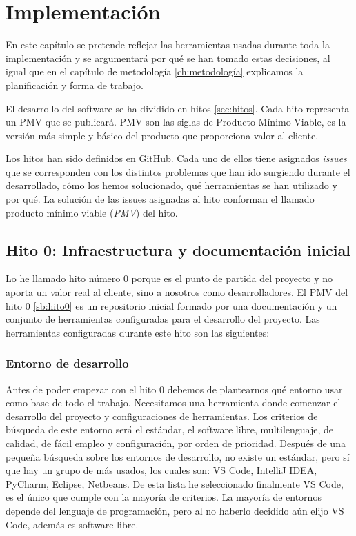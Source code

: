 
\chapter{Implementación}

En este capítulo se pretende reflejar las herramientas usadas durante toda la implementación y
se argumentará por qué se han tomado estas decisiones, al igual que en el capítulo de metodología \ref{ch:metodología} explicamos
la planificación y forma de trabajo.

El desarrollo del software se ha dividido en hitos \ref*{sec:hitos}. Cada hito representa un PMV que se publicará.
PMV son las siglas de Producto Mínimo Viable, es la versión más simple y básico del producto que proporciona valor al cliente.

Los \href{https://github.com/RubenDelgadoPareja/TFG-Triage-Inteligente-Consulta-Medica/milestones}{hitos} han sido definidos en GitHub.
Cada uno de ellos tiene asignados \href{https://github.com/RubenDelgadoPareja/TFG-Triage-Inteligente-Consulta-Medica/issues}{\textit{issues}} que se corresponden
con los distintos problemas que han ido surgiendo durante el desarrollado, cómo los hemos solucionado, qué herramientas se han utilizado y por qué.
La solución de las issues asignadas al hito conforman el llamado producto mínimo viable (\textit{PMV}) del hito.

\section{Hito 0: Infraestructura y documentación inicial}

Lo he llamado hito número 0 porque es el punto de partida del proyecto y no aporta un valor real al cliente, sino a nosotros como desarrolladores.
El PMV del hito 0 \ref{sb:hito0} es un repositorio inicial formado por una documentación y un conjunto de herramientas configuradas para el desarrollo del proyecto.
Las herramientas configuradas durante este hito son las siguientes:

\subsection{Entorno de desarrollo}
Antes de poder empezar con el hito 0 debemos de plantearnos qué entorno usar como base de todo el trabajo.
Necesitamos una herramienta donde comenzar el desarrollo del proyecto y configuraciones de herramientas.
Los criterios de búsqueda de este entorno será el estándar, el software libre, multilenguaje, de calidad, de fácil empleo y configuración, por orden de prioridad.
Después de una pequeña búsqueda sobre los entornos de desarrollo, no existe un estándar, pero sí que hay un grupo de más usados, los cuales son: VS Code, IntelliJ IDEA, PyCharm, Eclipse, Netbeans.
De esta lista he seleccionado finalmente VS Code, es el único que cumple con la mayoría de criterios. La mayoría de entornos depende del lenguaje de programación, pero al no haberlo
decidido aún elijo VS Code, además es software libre.

